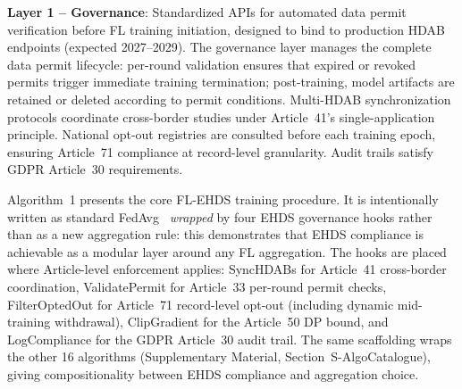 \documentclass[conference]{IEEEtran}
\begin{document}
\textbf{Layer 1 -- Governance}: Standardized APIs for automated data permit verification before FL training initiation, designed to bind to production HDAB endpoints (expected 2027--2029). The governance layer manages the complete data permit lifecycle: per-round validation ensures that expired or revoked permits trigger immediate training termination; post-training, model artifacts are retained or deleted according to permit conditions. Multi-HDAB synchronization protocols coordinate cross-border studies under Article~41's single-application principle. National opt-out registries are consulted before each training epoch, ensuring Article~71 compliance at record-level granularity. Audit trails satisfy GDPR Article~30 requirements.

Algorithm~1 presents the core FL-EHDS training procedure. It is intentionally written as standard FedAvg~\cite{mcmahan2017communication} \emph{wrapped} by four EHDS governance hooks rather than as a new aggregation rule: this demonstrates that EHDS compliance is achievable as a modular layer around any FL aggregation. The hooks are placed where Article-level enforcement applies: \textsf{SyncHDABs} for Article~41 cross-border coordination, \textsf{ValidatePermit} for Article~33 per-round permit checks, \textsf{FilterOptedOut} for Article~71 record-level opt-out (including dynamic mid-training withdrawal), \textsf{ClipGradient} for the Article~50 DP bound, and \textsf{LogCompliance} for the GDPR Article~30 audit trail. The same scaffolding wraps the other 16 algorithms (Supplementary Material, Section~S-AlgoCatalogue), giving compositionality between EHDS compliance and aggregation choice.
\end{document}

